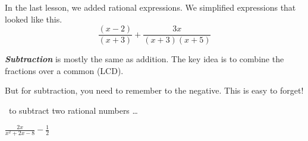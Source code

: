 In the last lesson, we added rational expressions. 
We simplified expressions that looked like this.
\[
    \frac
    {(x-2)}
    {(x+3)}
    +
    \frac
    {3x}
    {(x+3)(x+5)}
\]

\begin{myCenteredBox}[width=7in,]
    {\bfseries\itshape Subtraction} 
    is mostly the same as addition.
    The key idea is to combine the fractions 
    over a common  (LCD).\par
    \vspace{1em}
    But for subtraction, 
    you need to remember to  the negative.
    This is easy to forget!
\end{myCenteredBox}

\begin{myConceptSteps}{%
    ~to subtract two rational numbers \dots}
\end{myConceptSteps}



\begin{myWideProblem}{6.5in}
    {
        $
        \frac{2x}{x^2+2x-8}
        -
        \frac{1}{2}
        $
    }
\end{myWideProblem}
